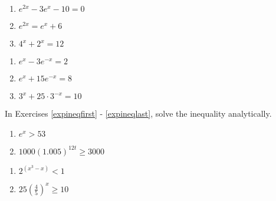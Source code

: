 \begin{multicols}{3}
\begin{enumerate}
\setcounter{enumi}{\value{HW}}

\item $e^{2x} - 3e^{x}-10=0$ %
\item $e^{2x} = e^{x}+6$ %
\item $4^{x} + 2^{x} = 12$ %


\setcounter{HW}{\value{enumi}}
\end{enumerate}
\end{multicols}

\begin{multicols}{3}
\begin{enumerate}
\setcounter{enumi}{\value{HW}}

\item $e^{x}-3e^{-x}=2$ %
\item $e^{x}+15e^{-x}=8$ %
\item $3^{x}+25\cdot3^{-x}=10$ %
\label{expeqnlast} 

\setcounter{HW}{\value{enumi}}
\end{enumerate}
\end{multicols}



In Exercises \ref{expineqfirst} - \ref{expineqlast}, solve the inequality analytically.

\begin{multicols}{2} 
\begin{enumerate}
\setcounter{enumi}{\value{HW}}

\item $e^{x} > 53$ \label{expineqfirst} 
\item $1000\left(1.005\right)^{12t} \geq 3000$ 

\setcounter{HW}{\value{enumi}}
\end{enumerate}
\end{multicols}

\begin{multicols}{2} 
\begin{enumerate}
\setcounter{enumi}{\value{HW}}

\item $2^{(x^{3} - x)} < 1$
\item $25\left(\frac{4}{5}\right)^{x} \geq 10$

\setcounter{HW}{\value{enumi}}
\end{enumerate}
\end{multicols}

